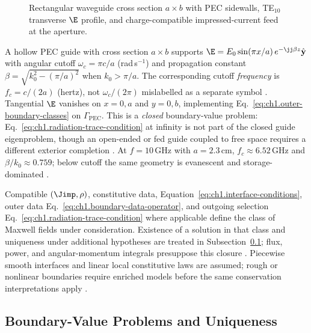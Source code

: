 \begin{figure}[t]
\centering
{}
\caption{Rectangular waveguide cross section $a\times b$ with PEC sidewalls, TE$_{10}$ transverse $\E$ profile, and charge-compatible impressed-current feed at the aperture.}
\label{fig:ch1.wp-te10-waveguide}
\end{figure}
\begin{example}
\label{ex:ch1.te10-waveguide}
A hollow PEC guide with cross section $a\times b$ supports $\E=E_0\sin(\pi x/a)\,e^{-\jj\beta z}\hat{\mathbf{y}}$ with angular cutoff $\omega_c=\pi c/a$ (rad\,s$^{-1}$) and propagation constant $\beta=\sqrt{k_0^2-(\pi/a)^2}$ when $k_0>\pi/a$. The corresponding cutoff \emph{frequency} is $f_c=c/(2a)$ (hertz), not $\omega_c/(2\pi)$ mislabelled as a separate symbol \cite{stratton1941,collin2001}. Tangential $\E$ vanishes on $x=0,a$ and $y=0,b$, implementing Eq.~\eqref{eq:ch1.outer-boundary-classes} on $\Gamma_{\mathrm{PEC}}$. This is a \emph{closed} boundary-value problem: Eq.~\eqref{eq:ch1.radiation-trace-condition} at infinity is not part of the closed guide eigenproblem, though an open-ended or fed guide coupled to free space requires a different exterior completion \cite{stratton1941,collin2001}. At $f=10\,\mathrm{GHz}$ with $a=2.3\,\mathrm{cm}$, $f_c\approx 6.52\,\mathrm{GHz}$ and $\beta/k_0\approx 0.759$; below cutoff the same geometry is evanescent and storage-dominated \cite{harrington2001}.
\end{example}

Compatible $(\Jimp,\rho)$, constitutive data, Equation~\eqref{eq:ch1.interface-conditions}, outer data Eq.~\eqref{eq:ch1.boundary-data-operator}, and outgoing selection Eq.~\eqref{eq:ch1.radiation-trace-condition} where applicable define the class of Maxwell fields under consideration. Existence of a solution in that class and uniqueness under additional hypotheses are treated in Subsection~\ref{sec:ch01.1.3}; flux, power, and angular-momentum integrals presuppose this closure \cite{maxwell1873,stratton1941}. Piecewise smooth interfaces and linear local constitutive laws are assumed; rough or nonlinear boundaries require enriched models before the same conservation interpretations apply \cite{stratton1941}.

\subsection{Boundary-Value Problems and Uniqueness}
\label{sec:ch01.1.3}

